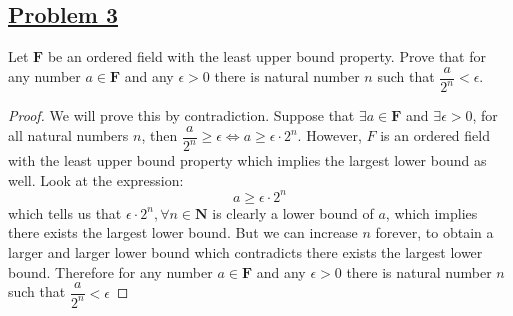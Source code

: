\documentclass[10pt,letterpaper]{article}
\begin{document}
	\subsection*{{\color{purple}\underline{Problem 3}}}
	Let $\mathbf{F}$ be an ordered field with the least upper bound property. Prove that for any number
	$a \in \mathbf{F}$ and any $\epsilon > 0$ there is natural number $n$ such that $\dfrac{a}{2^n} < \epsilon$. \\
	\begin{proof}
		We will prove this by contradiction. Suppose that $\exists a \in \mathbf{F}$ and $\exists \epsilon > 0$, for 
		all natural numbers $n$, then $\dfrac{a}{2^n} \geq \epsilon \Leftrightarrow 
		a \geq \epsilon \cdot 2^n$. However, $F$ is an ordered field with the least upper bound property which implies
		the largest lower bound as well. Look at the expression:
		$$a \geq \epsilon \cdot 2^n$$
		which tells us that $\epsilon \cdot 2^n, \forall n \in \mathbf{N}$ is clearly a lower bound of $a$, which implies
		there exists the largest lower bound. But we can increase $n$ forever, to obtain a larger and larger lower bound which 
		contradicts there exists the largest lower bound. Therefore for any number
		$a \in \mathbf{F}$ and any $\epsilon > 0$ there is natural number $n$ such that $\dfrac{a}{2^n} < \epsilon$
	\end{proof}
	
	
\end{document}
